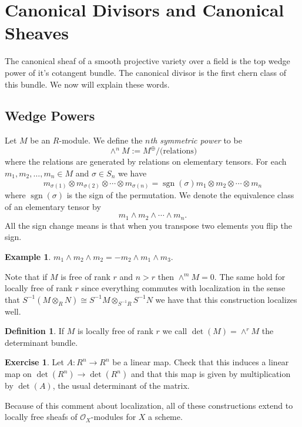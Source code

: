 \documentclass[12pt]{article}
\numberwithin{equation}{section}
\theoremstyle{definition}
\newtheorem{definition}[theorem]{Definition}
\newtheorem{example}[theorem]{Example}
\newtheorem{exercise}[theorem]{Exercise}
\theoremstyle{remark}
\newcommand{\Ocal}{\mathcal{O}}
\newcommand{\sgn}{\operatorname{sgn}}
\begin{document}
\section{Canonical Divisors and Canonical Sheaves}

The canonical sheaf of a smooth projective variety over a field is the top wedge power of it's cotangent bundle. 
The canonical divisor is the first chern class of this bundle. 
We now will explain these words.
\subsection{Wedge Powers}
Let $M$ be an $R$-module. 
We define the \emph{$n$th symmetric power} to be 
 $$ \wedge^n M := M^{\oplus}/\mbox{(relations)}$$
where the relations are generated by relations on elementary tensors. 
For each $m_1,m_2,\ldots,m_n\in M$ and $\sigma\in S_n$ we have 
 $$m_{\sigma(1)} \otimes m_{\sigma(2)} \otimes \cdots \otimes m_{\sigma(n)} = \sgn(\sigma) m_1\otimes m_2 \otimes \cdots \otimes m_n$$
where $\sgn(\sigma)$ is the sign of the permutation.
We denote the equivalence class of an elementary tensor by 
 $$ m_1 \wedge m_2 \wedge \cdots \wedge m_n. $$
 All the sign change means is that when you transpose two elements you flip the sign.
 \begin{example}
 $m_1 \wedge m_2 \wedge m_2 = - m_2 \wedge m_1 \wedge m_3$. 
 \end{example}
 Note that if $M$ is free of rank $r$ and $n>r$ then $\wedge^mM=0$. 
 The same hold for locally free of rank $r$ since everything commutes with localization in the sense that $S^{-1}(M\otimes_R N) \cong S^{-1}M \otimes_{S^{-1}R} S^{-1}N$ we have that this construction localizes well. 
 
 \begin{definition}
 	If $M$ is locally free of rank $r$ we call $\det(M) = \wedge^r M$ the determinant bundle. 
 \end{definition}

\begin{exercise}
	Let $A:R^n \to R^n$ be a linear map. 
	Check that this induces a linear map on $\det(R^n) \to \det(R^n)$ and that this map is given by multiplication by $\det(A)$, the usual determinant of the matrix.
\end{exercise}

Because of this comment about localization, all of these constructions extend to locally free sheafs of $\Ocal_X$-modules for $X$ a scheme.
\end{document}
